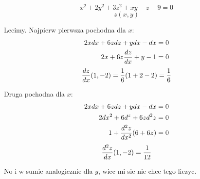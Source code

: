 \documentclass{article}[13pt]
\begin{document}
    $$x^2+2y^2+3z^2+xy-z-9=0$$
    $$z(x,y)$$

    Lecimy. Najpierw pierwsza pochodna dla $x$:
    \begin{align*}
        2xdx+6zdz+ydx-dx&=0\\
        2x+6z{dz\over dx}+y-1&=0
    \end{align*}
    $${dz\over dx}(1,-2)=\frac16(1+2-2)=\frac16$$

    Druga pochodna dla $x$:
    \begin{align*}
        2xdx+6zdz+ydx-dx&=0\\
        2dx^2+6d^z+6zd^2z&=0\\
        1+{d^2z\over dx^2}(6+6z)&=0
    \end{align*}
    $${d^2z\over dx}(1, -2)={1\over 12}$$

    No i w sumie analogicznie dla $y$, wiec mi sie nie chce tego liczyc.
\end{document}
